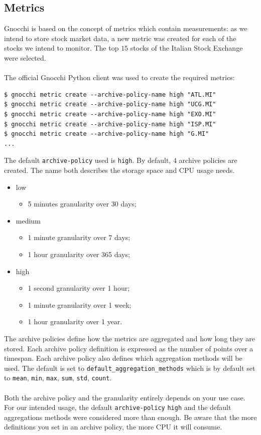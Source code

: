 \documentclass[11pt,a4paper]{article}
\begin{document}
\subsection{Metrics}
Gnocchi is based on the concept of metrics which contain measurements: as we intend to store stock market data, a new metric was created for each of the stocks we intend to monitor. The top $15$ stocks of the Italian Stock Exchange were selected.\\
\\
The official Gnocchi Python client was used to create the required metrics:
\begin{lstlisting}[]
$ gnocchi metric create --archive-policy-name high "ATL.MI"
$ gnocchi metric create --archive-policy-name high "UCG.MI"
$ gnocchi metric create --archive-policy-name high "EXO.MI"
$ gnocchi metric create --archive-policy-name high "ISP.MI"
$ gnocchi metric create --archive-policy-name high "G.MI"
...
\end{lstlisting}
The default \texttt{archive-policy} used is \texttt{high}. By default, $4$ archive policies are created. The name both describes the storage space and CPU usage needs.
\begin{itemize}[noitemsep]
    \item low
    \begin{itemize}
        \item 5 minutes granularity over 30 days;
    \end{itemize}
    \item medium
    \begin{itemize}
        \item 1 minute granularity over 7 days;
        \item 1 hour granularity over 365 days;
    \end{itemize}
    \item high
    \begin{itemize}
        \item 1 second granularity over 1 hour;
        \item 1 minute granularity over 1 week;
        \item 1 hour granularity over 1 year.
    \end{itemize}
\end{itemize}
The archive policies define how the metrics are aggregated and how long they are stored. Each archive policy definition is expressed as the number of points over a timespan. Each archive policy also defines which aggregation methods will be used. The default is set to \texttt{default\_aggregation\_methods} which is by default set to \texttt{mean}, \texttt{min}, \texttt{max}, \texttt{sum}, \texttt{std}, \texttt{count}.\\
\\
Both the archive policy and the granularity entirely depends on your use case. For our intended usage, the default \texttt{archive-policy} \texttt{high} and the default aggregations methods were considered more than enough. Be aware that the more definitions you set in an archive policy, the more CPU it will consume.
\end{document}
